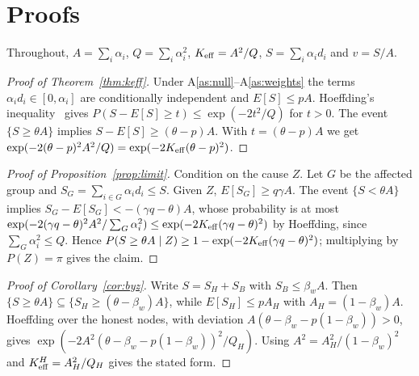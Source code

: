 \section{Proofs}\label{app:proofs}
\noindent Throughout, $A=\sum_i\alpha_i$, $Q=\sum_i\alpha_i^2$, $K_{\mathrm{eff}}=A^2/Q$, $S=\sum_i\alpha_id_i$ and $v=S/A$.

\begin{proof}[Proof of Theorem~\ref{thm:keff}]
Under A\ref{as:null}--A\ref{as:weights} the terms $\alpha_id_i\in[0,\alpha_i]$ are conditionally independent and $E[S]\le pA$. Hoeffding's inequality~\cite{hoeffding1963} gives $P(S-E[S]\ge t)\le\exp(-2t^2/Q)$ for $t>0$. The event $\{S\ge\theta A\}$ implies $S-E[S]\ge(\theta-p)A$. With $t=(\theta-p)A$ we get $\exp(-2(\theta-p)^2A^2/Q)=\exp(-2K_{\mathrm{eff}}(\theta-p)^2)$.
\end{proof}

\begin{proof}[Proof of Proposition~\ref{prop:limit}]
Condition on the cause $Z$. Let $G$ be the affected group and $S_G=\sum_{i\in G}\alpha_id_i\le S$. Given $Z$, $E[S_G]\ge q\gamma A$. The event $\{S<\theta A\}$ implies $S_G-E[S_G]<-(\gamma q-\theta)A$, whose probability is at most $\exp(-2(\gamma q-\theta)^2A^2/\sum_{G}\alpha_i^2)\le\exp(-2K_{\mathrm{eff}}(\gamma q-\theta)^2)$ by Hoeffding, since $\sum_G\alpha_i^2\le Q$. Hence $P(S\ge\theta A\mid Z)\ge1-\exp(-2K_{\mathrm{eff}}(\gamma q-\theta)^2)$; multiplying by $P(Z)=\pi$ gives the claim.
\end{proof}

\begin{proof}[Proof of Corollary~\ref{cor:byz}]
Write $S=S_H+S_B$ with $S_B\le\beta_wA$. Then $\{S\ge\theta A\}\subseteq\{S_H\ge(\theta-\beta_w)A\}$, while $E[S_H]\le pA_H$ with $A_H=(1-\beta_w)A$. Hoeffding over the honest nodes, with deviation $A(\theta-\beta_w-p(1-\beta_w))>0$, gives $\exp(-2A^2(\theta-\beta_w-p(1-\beta_w))^2/Q_H)$. Using $A^2=A_H^2/(1-\beta_w)^2$ and $K_{\mathrm{eff}}^H=A_H^2/Q_H$ gives the stated form.
\end{proof}

